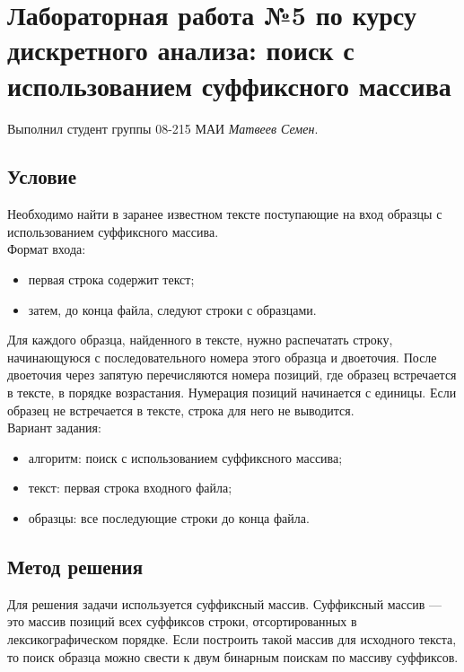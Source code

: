 \documentclass[12pt]{article}
\begin{document}
\section*{Лабораторная работа №5 по курсу дискретного анализа: поиск с использованием суффиксного массива}

Выполнил студент группы 08-215 МАИ \textit{Матвеев Семен}.

\subsection*{Условие}
\hspace{2ex}
Необходимо найти в заранее известном тексте поступающие на вход образцы с использованием суффиксного массива. \\

Формат входа:
\begin{itemize}
    \item первая строка содержит текст;
    \item затем, до конца файла, следуют строки с образцами.
\end{itemize}

Для каждого образца, найденного в тексте, нужно распечатать строку, начинающуюся с последовательного номера этого образца и двоеточия. После двоеточия через запятую перечисляются номера позиций, где образец встречается в тексте, в порядке возрастания. Нумерация позиций начинается с единицы. Если образец не встречается в тексте, строка для него не выводится. \\

Вариант задания:
\begin{itemize}
    \item алгоритм: поиск с использованием суффиксного массива;
    \item текст: первая строка входного файла;
    \item образцы: все последующие строки до конца файла.
\end{itemize}

\subsection*{Метод решения}
\hspace{2ex}
Для решения задачи используется суффиксный массив. Суффиксный массив — это массив позиций всех суффиксов строки, отсортированных в лексикографическом порядке. Если построить такой массив для исходного текста, то поиск образца можно свести к двум бинарным поискам по массиву суффиксов. \\
\end{document}
